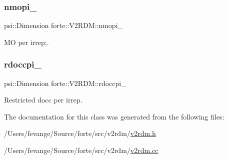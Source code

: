 \subsubsection{\texorpdfstring{nmopi\+\_\+}{nmopi\_}}
{\footnotesize\ttfamily psi\+::\+Dimension forte\+::\+V2\+R\+D\+M\+::nmopi\+\_\+\hspace{0.3cm}{\ttfamily [protected]}}



MO per irrep;. 

\mbox{\label{classforte_1_1_v2_r_d_m_a2a78e5ea658944a173f7852a0434d6ff}} 
\subsubsection{\texorpdfstring{rdoccpi\+\_\+}{rdoccpi\_}}
{\footnotesize\ttfamily psi\+::\+Dimension forte\+::\+V2\+R\+D\+M\+::rdoccpi\+\_\+\hspace{0.3cm}{\ttfamily [protected]}}



Restricted docc per irrep. 



The documentation for this class was generated from the following files\+:\begin{DoxyCompactItemize}
\item 
/\+Users/fevange/\+Source/forte/src/v2rdm/\mbox{\hyperlink{v2rdm_8h}{v2rdm.\+h}}\item 
/\+Users/fevange/\+Source/forte/src/v2rdm/\mbox{\hyperlink{v2rdm_8cc}{v2rdm.\+cc}}\end{DoxyCompactItemize}

